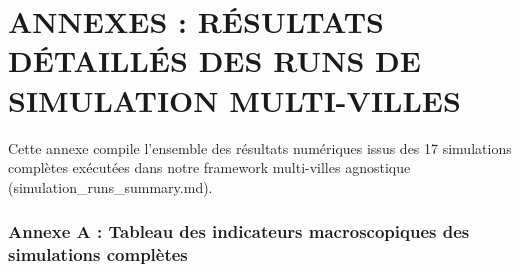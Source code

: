 \documentclass[11pt, a4paper]{article}
\begin{document}
\newpage

\section{ANNEXES : RÉSULTATS DÉTAILLÉS DES RUNS DE SIMULATION
MULTI-VILLES}\label{annexes-ruxe9sultats-duxe9tailluxe9s-des-runs-de-simulation-multi-villes}

Cette annexe compile l'ensemble des résultats numériques issus des 17
simulations complètes exécutées dans notre framework multi-villes
agnostique (simulation\_runs\_summary.md).

\subsubsection{Annexe A : Tableau des indicateurs macroscopiques des
simulations
complètes}\label{annexe-a-tableau-des-indicateurs-macroscopiques-des-simulations-compluxe8tes}
\end{document}
